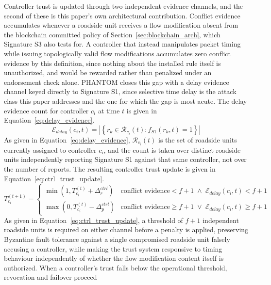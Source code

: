 \documentclass[final,5p,twocolumn]{elsarticle}
\theoremstyle{remark}
\theoremstyle{plain}
\begin{document}
Controller trust is updated through two independent evidence channels, and
the second of these is this paper's own architectural contribution. Conflict
evidence accumulates whenever a roadside unit receives a flow modification
absent from the blockchain committed policy of
Section~\ref{sec:blockchain_arch}, which Signature S3 also tests for. A
controller that instead manipulates packet timing while issuing
topologically valid flow modifications accumulates zero conflict evidence by
this definition, since nothing about the installed rule itself is
unauthorized, and would be rewarded rather than penalized under an
endorsement check alone. PHANTOM closes this gap with a delay evidence
channel keyed directly to Signature S1, since selective time delay is the
attack class this paper addresses and the one for which the gap is most
acute. The delay evidence count for controller $c_i$ at time $t$ is given in
Equation~\eqref{eq:delay_evidence}.
\begin{equation}
	\mathcal{E}_{delay}(c_i,t) = \left|\left\{ r_k \in \mathcal{R}_{c_i}(t) : f_{S1}(r_k,t) = 1 \right\}\right|
	\label{eq:delay_evidence}
\end{equation}
As given in Equation~\eqref{eq:delay_evidence}, $\mathcal{R}_{c_i}(t)$ is the
set of roadside units currently assigned to controller $c_i$, and the count
is taken over distinct roadside units independently reporting Signature S1
against that same controller, not over the number of reports. The resulting
controller trust update is given in Equation~\eqref{eq:ctrl_trust_update}.
\begin{equation}
	T_{c_i}^{(t+1)} =
	\begin{cases}
		\min(1, T_{c_i}^{(t)} + \Delta_r^{ctrl}) & \text{conflict evidence} < f{+}1 \;\land\; \mathcal{E}_{delay}(c_i,t) < f{+}1 \\
		\max(0, T_{c_i}^{(t)} - \Delta_p^{ctrl}) & \text{conflict evidence} \geq f{+}1 \;\lor\; \mathcal{E}_{delay}(c_i,t) \geq f{+}1
	\end{cases}
	\label{eq:ctrl_trust_update}
\end{equation}
As given in Equation~\eqref{eq:ctrl_trust_update}, a threshold of $f{+}1$
independent roadside units is required on either channel before a penalty is
applied, preserving Byzantine fault tolerance against a single compromised
roadside unit falsely accusing a controller, while making the trust system
responsive to timing behaviour independently of whether the flow
modification content itself is authorized. When a controller's trust falls
below the operational threshold, revocation and failover proceed
\end{document}

